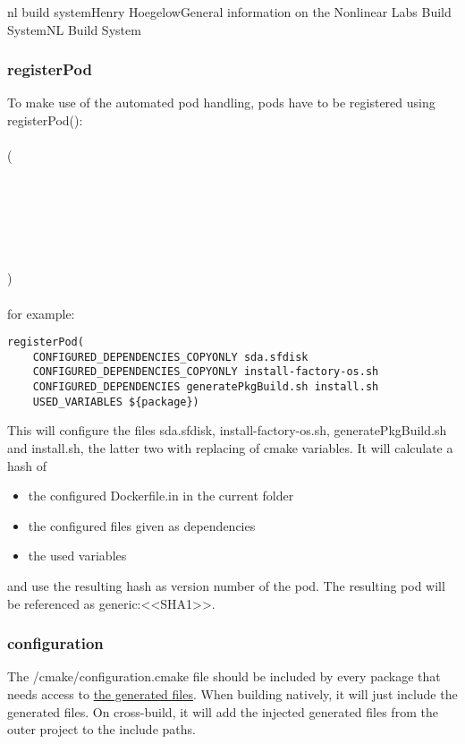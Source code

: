 \documentclass[11pt]{article}
\begin{document}
\begin{Name}{1}{nl build system}{Henry Hoegelow}{General information on the Nonlinear Labs Build System}{NL Build System}
\subsubsection{registerPod}
To make use of the automated pod handling, pods have to be registered using registerPod():\\
\\
(\\
\indent{}\\
\indent{}\\
\indent{}\\
\indent{}\\
\indent{}\\
\indent{}\\
\indent{})\\
\\
for example:
\begin{verbatim}
registerPod(
	CONFIGURED_DEPENDENCIES_COPYONLY sda.sfdisk 
	CONFIGURED_DEPENDENCIES_COPYONLY install-factory-os.sh
	CONFIGURED_DEPENDENCIES generatePkgBuild.sh install.sh
	USED_VARIABLES ${package})
\end{verbatim}
This will configure the files sda.sfdisk, install-factory-os.sh, generatePkgBuild.sh and install.sh, the latter two with replacing of cmake variables. It will calculate a hash of
\begin{itemize}
\item the configured Dockerfile.in in the current folder
\item the configured files given as dependencies
\item the used variables
\end{itemize}
and use the resulting hash as version number of the pod. The resulting pod will be referenced as generic:<<SHA1>>.

\subsubsection{configuration}
The /cmake/configuration.cmake file should be included by every package that needs access to \hyperref[whygenerated]{the generated files}. When building natively, it will just include the generated files. On cross-build, it will add the injected generated files from the outer project to the include paths.


\end{Name}
\end{document}
